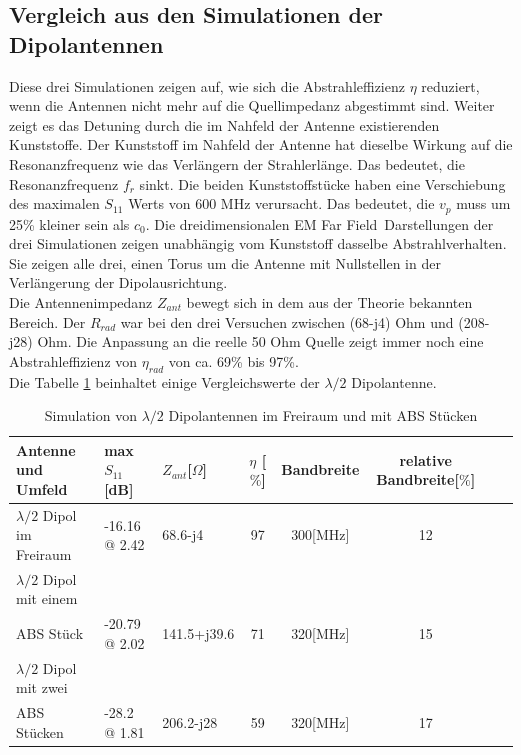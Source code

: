 \subsection{Vergleich aus den Simulationen der Dipolantennen}
Diese drei Simulationen zeigen auf, wie sich die Abstrahleffizienz $\eta$ reduziert, wenn die Antennen nicht mehr auf die Quellimpedanz abgestimmt sind. Weiter zeigt es das Detuning durch die im Nahfeld der Antenne existierenden Kunststoffe. Der Kunststoff im Nahfeld der Antenne hat dieselbe Wirkung auf die Resonanzfrequenz wie das Verlängern der  Strahlerlänge. Das bedeutet, die Resonanzfrequenz $f_{r}$ sinkt.  Die beiden Kunststoffstücke haben eine Verschiebung des maximalen $S_{11}$ Werts von 600 MHz verursacht. Das bedeutet, die $v_p$ muss um 25\% kleiner sein als $c_0$.
Die dreidimensionalen \glqq EM Far Field\grqq \  Darstellungen der drei Simulationen zeigen unabhängig vom Kunststoff dasselbe Abstrahlverhalten. Sie zeigen alle drei, einen Torus um die Antenne mit Nullstellen in der Verlängerung der Dipolausrichtung.\\
Die Antennenimpedanz $Z_{ant}$ bewegt sich in dem aus der Theorie \cite{elliott1981antenna} bekannten Bereich. Der $R_{rad}$ war bei den drei Versuchen zwischen (68-j4) Ohm und  (208-j28) Ohm. Die Anpassung an die reelle 50 Ohm Quelle zeigt immer noch eine Abstrahleffizienz von $\eta_{rad}$ von   ca. 69\% bis 97\%.\\

Die Tabelle \ref{tab:Evaluation_Vergeich_Dipolantennen} beinhaltet einige Vergleichswerte der $\lambda/2$ Dipolantenne.
\begin{table}[!h]
  \centering
  \begin{tabular}{p{4cm} p{2cm} l  c c c c r} 
  \toprule 
  Antenne und Umfeld             & max $S_{11}$[dB]		& $Z_{ant}$[$\Omega$] 	& $\eta$ [$\%$] & Bandbreite & relative Bandbreite[$\%$]\\ 
  \midrule
$\lambda/2$ Dipol im Freiraum    			&	-16.16 @ 2.42		&  	68.6-j4			&   	97	&	300[MHz] & 12\\         		
$\lambda/2$ Dipol mit einem \\ABS Stück 	&   -20.79 @ 2.02  		&	141.5+j39.6		&	71	&	320[MHz]	 & 15\\
$\lambda/2$ Dipol mit zwei \\ABS Stücken 	&   -28.2 @ 1.81    	&	206.2-j28		&	59	&	320[MHz]	 & 17\\
 \bottomrule
  \end{tabular}
  \caption{Simulation von $\lambda/2$ Dipolantennen im Freiraum und mit ABS Stücken}
  \label{tab:Evaluation_Vergeich_Dipolantennen}
\end{table}



